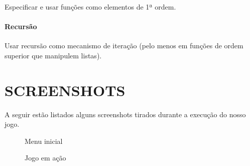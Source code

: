 \documentclass[rel_mlp]{iiufrgs}
\begin{document}
Especificar e usar funções como elementos de 1ª ordem.


\subsubsection{Recursão}

Usar recursão como mecanismo de iteração (pelo menos em funções de ordem superior que manipulem listas).

%
\chapter{SCREENSHOTS}

A seguir estão listados alguns screenshots tirados durante a execução do nosso jogo.

\begin{figure}[htb]
    \centering
    \caption{Menu inicial}
    \label{fig:figura1}
\end{figure}

\begin{figure}[htb]
    \centering
    \caption{Jogo em ação}
    \label{fig:figura1}
\end{figure}
\end{document}
